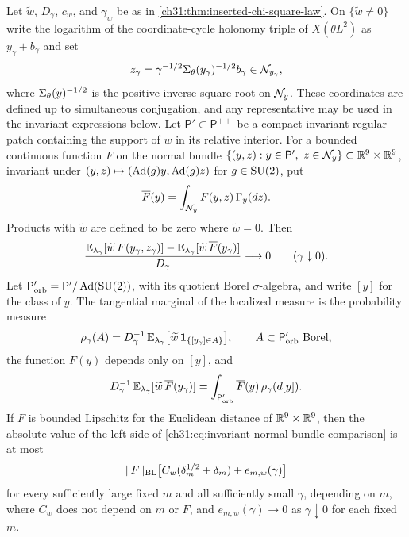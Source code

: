 \begin{theorem}\label{ch31:thm:invariant-normal-bundle-gaussian}
Let $\widetilde w$, $D_\gamma$, $c_w$, and $\gamma_w$ be as in \cref{ch31:thm:inserted-chi-square-law}. On $\{\widetilde w\ne0\}$ write the logarithm of the coordinate-cycle holonomy triple of $X(\theta L^2)$ as $y_\gamma+b_\gamma$ and set
\[
 z_\gamma=\gamma^{-1/2}\Sigma_\theta(y_\gamma)^{-1/2}b_\gamma\in\mathcal N_{y_\gamma},
\]
where $\Sigma_\theta(y)^{-1/2}$ is the positive inverse square root on $\mathcal N_{y}$. These coordinates are defined up to simultaneous conjugation, and any representative may be used in the invariant expressions below. Let $\mathsf P'\subset\mathsf P^{++}$ be a compact invariant regular patch containing the support of $w$ in its relative interior. For a bounded continuous function $F$ on the normal bundle $\{(y,z):y\in\mathsf P',\ z\in\NormalFiber y\}\subset\R^9\times\R^9$, invariant under $(y,z)\mapsto(\operatorname{Ad}(g)y,\operatorname{Ad}(g)z)$ for $g\in\mathrm{SU}(2)$, put
\[
 \overline F(y)=\int_{\mathcal N_{y}}F(y,z)\,\Gamma_y(dz).
\]
Products with $\widetilde w$ are defined to be zero where $\widetilde w=0$. Then
\begin{equation}\label{ch31:eq:invariant-normal-bundle-comparison}
 \frac{\mathbb E_{\lambda_\gamma}[\widetilde w\,F(y_\gamma,z_\gamma)]-\mathbb E_{\lambda_\gamma}[\widetilde w\,\overline F(y_\gamma)]}{D_\gamma}\longrightarrow0\qquad(\gamma\downarrow0).
\end{equation}
Let $\mathsf P'_{\rm orb}=\mathsf P'/\operatorname{Ad}(\mathrm{SU}(2))$, with its quotient Borel $\sigma$-algebra, and write $[y]$ for the class of $y$. The tangential marginal of the localized measure is the probability measure
\[
 \rho_\gamma(A)=D_\gamma^{-1}\,\mathbb E_{\lambda_\gamma}\bigl[\widetilde w\,\mathbf 1_{\{[y_\gamma]\in A\}}\bigr],\qquad A\subset\mathsf P'_{\rm orb}\text{ Borel},
\]
the function $\overline F(y)$ depends only on $[y]$, and
\[
 D_\gamma^{-1}\,\mathbb E_{\lambda_\gamma}[\widetilde w\,\overline F(y_\gamma)]=\int_{\mathsf P'_{\rm orb}}\overline F(y)\,\rho_\gamma(d[y]).
\]
If $F$ is bounded Lipschitz for the Euclidean distance of $\mathbb R^9\times\mathbb R^9$, then the absolute value of the left side of \eqref{ch31:eq:invariant-normal-bundle-comparison} is at most
\begin{equation}\label{ch31:eq:normal-bundle-ordered-error}
 \lVert F\rVert_{\rm BL}\bigl[C_w(\delta_m^{1/2}+\delta_m)+e_{m,w}(\gamma)\bigr]
\end{equation}
for every sufficiently large fixed $m$ and all sufficiently small $\gamma$, depending on $m$, where $C_w$ does not depend on $m$ or $F$, and $e_{m,w}(\gamma)\to0$ as $\gamma\downarrow0$ for each fixed $m$.
\end{theorem}

